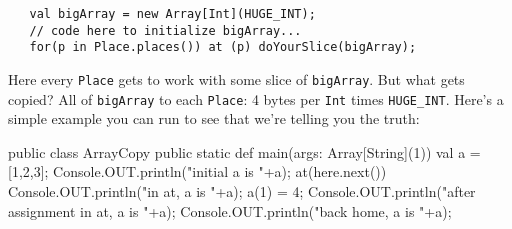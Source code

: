 \begin{verbatim}
   val bigArray = new Array[Int](HUGE_INT);
   // code here to initialize bigArray...
   for(p in Place.places()) at (p) doYourSlice(bigArray);
\end{verbatim}
Here every {\tt Place} gets to work with some slice of {\tt bigArray}. But what
gets copied?  All of {\tt bigArray} to each {\tt Place}: 4 bytes per {\tt Int}
times {\tt HUGE\_INT}.  Here's a simple example you can run to see that we're
telling you the truth:
\begin{xtennum}[]
public class ArrayCopy {
   public static def main(args: Array[String](1)) {
      val a = [1,2,3];
      Console.OUT.println("initial a is "+a);
      at(here.next()) {
         Console.OUT.println("in at, a is "+a);
         a(1) = 4;                              
         Console.OUT.println("after assignment in at, a is "+a); 
      }
      Console.OUT.println("back home, a is "+a); 
   }
}
\end{xtennum}
